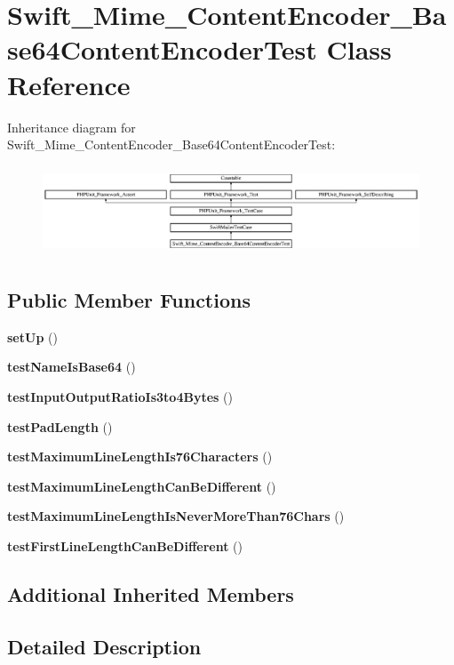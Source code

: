 \section{Swift\+\_\+\+Mime\+\_\+\+Content\+Encoder\+\_\+\+Base64\+Content\+Encoder\+Test Class Reference}
\label{class_swift___mime___content_encoder___base64_content_encoder_test}
Inheritance diagram for Swift\+\_\+\+Mime\+\_\+\+Content\+Encoder\+\_\+\+Base64\+Content\+Encoder\+Test\+:\begin{figure}[H]
\begin{center}
\leavevmode
\includegraphics[height=2.705314cm]{class_swift___mime___content_encoder___base64_content_encoder_test}
\end{center}
\end{figure}
\subsection*{Public Member Functions}
\begin{DoxyCompactItemize}
\item 
{\bf set\+Up} ()
\item 
{\bf test\+Name\+Is\+Base64} ()
\item 
{\bf test\+Input\+Output\+Ratio\+Is3to4\+Bytes} ()
\item 
{\bf test\+Pad\+Length} ()
\item 
{\bf test\+Maximum\+Line\+Length\+Is76\+Characters} ()
\item 
{\bf test\+Maximum\+Line\+Length\+Can\+Be\+Different} ()
\item 
{\bf test\+Maximum\+Line\+Length\+Is\+Never\+More\+Than76\+Chars} ()
\item 
{\bf test\+First\+Line\+Length\+Can\+Be\+Different} ()
\end{DoxyCompactItemize}
\subsection*{Additional Inherited Members}


\subsection{Detailed Description}


